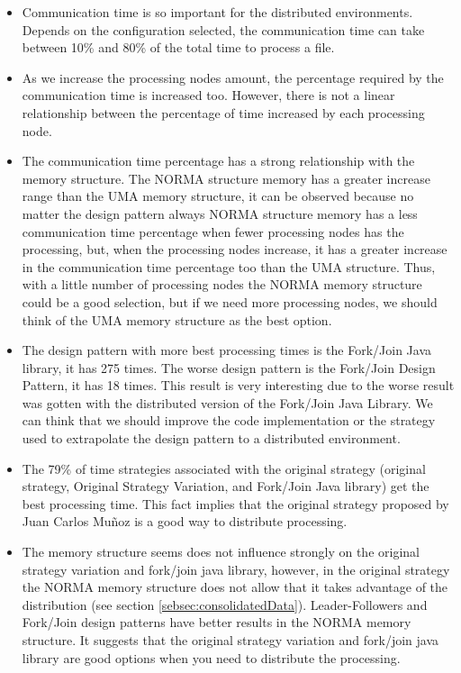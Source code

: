 \begin{itemize}
	\item Communication time is so important for the distributed environments. Depends on the configuration selected, the communication time can take between 10\% and 80\% of the total time to process a file. 
	\item As we increase the processing nodes amount, the percentage required by the communication time is increased too. However, there is not a linear relationship between the percentage of time increased by each processing node. 
	\item The communication time percentage has a strong relationship with the memory structure. The NORMA structure memory has a greater increase range than the UMA memory structure, it can be observed because no matter the design pattern always NORMA structure memory has a less communication time percentage when fewer processing nodes has the processing, but, when the processing nodes increase, it has a greater increase in the communication time percentage too than the UMA structure. Thus, with a little number of processing nodes the NORMA memory structure could be a good selection, but if we need more processing nodes, we should think of the UMA memory structure as the best option.
	\item The design pattern with more best processing times is the Fork/Join Java library, it has 275 times. The worse design pattern is the Fork/Join Design Pattern, it has 18 times. This result is very interesting due to the worse result was gotten with the distributed version of the Fork/Join Java Library. We can think that we should improve the code implementation or the strategy used to extrapolate the design pattern to a distributed environment. 
	\item The 79\% of time strategies associated with the original strategy (original strategy, Original Strategy Variation, and Fork/Join Java library) get the best processing time. This fact implies that the original strategy proposed by Juan Carlos Muñoz is a good way to distribute processing.
	\item The memory structure seems does not influence strongly on the original strategy variation and fork/join java library, however, in the original strategy the NORMA memory structure does not allow that it takes advantage of the distribution (see section \ref{sebsec:consolidatedData}). Leader-Followers and Fork/Join design patterns have better results in the NORMA memory structure. It suggests that the original strategy variation and fork/join java library are good options when you need to distribute the processing.

\end{itemize}

